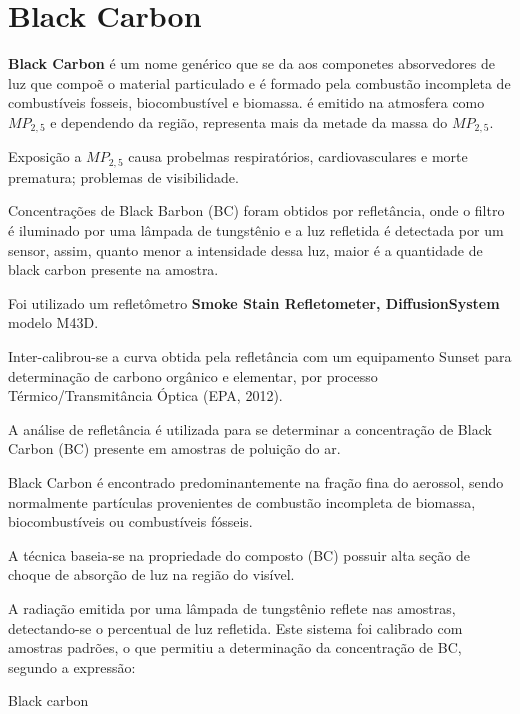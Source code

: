 \section{Black Carbon}

\textbf{Black Carbon} é um nome genérico que se da aos componetes
absorvedores de luz que compoẽ o material particulado e é formado pela combustão
incompleta de combustíveis fosseis, biocombustível e biomassa. 
é emitido na atmosfera como $MP_{2,5}$ e dependendo da região, representa 
mais da metade da massa do $MP_{2,5}$.


Exposição a $MP_{2,5}$  causa probelmas respiratórios, cardiovasculares e morte prematura; 
problemas de visibilidade. 



Concentrações de Black Barbon (BC) foram obtidos por  refletância, 
onde o filtro é iluminado por uma lâmpada de tungstênio e a luz refletida é 
detectada por um sensor, assim, quanto menor a intensidade dessa luz,
 maior é a quantidade de black carbon presente na amostra. 

Foi utilizado um refletômetro 
\textbf{Smoke Stain Refletometer, DiffusionSystem} modelo M43D. 

Inter-calibrou-se a curva obtida pela refletância com um equipamento 
Sunset para determinação de carbono orgânico e elementar, 
por processo Térmico/Transmitância Óptica (EPA, 2012).

A análise de refletância  é utilizada para se determinar a concentração 
de Black Carbon (BC) presente em amostras de poluição do ar. 

Black Carbon é encontrado  predominantemente na fração fina do aerossol, 
sendo normalmente partículas provenientes de combustão incompleta de biomassa, 
biocombustíveis ou combustíveis fósseis. 

A técnica baseia-se na propriedade do composto (BC) possuir alta seção de 
choque de absorção de luz na região do visível. 

A radiação emitida por uma lâmpada de tungstênio reflete nas amostras, 
detectando-se o percentual de luz refletida. Este sistema foi calibrado 
com amostras padrões, o que permitiu a determinação da concentração de BC, 
segundo a expressão:

Black carbon 

